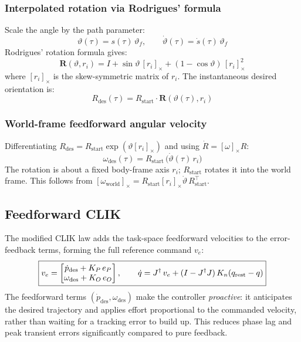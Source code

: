 \documentclass[11pt,a4paper]{article}
\begin{document}
\subsubsection*{Interpolated rotation via Rodrigues' formula}
Scale the angle by the path parameter:
\begin{equation}
  \vartheta(\tau)=s(\tau)\,\vartheta_f, \qquad \dot{\vartheta}(\tau)=\dot{s}(\tau)\,\vartheta_f
\end{equation}
Rodrigues' rotation formula gives:
\begin{equation}
  \mathbf{R}(\vartheta,r_i)=I+\sin\vartheta\,[r_i]_\times+(1-\cos\vartheta)\,[r_i]_\times^2
\end{equation}
where $[r_i]_\times$ is the skew-symmetric matrix of $r_i$. The instantaneous desired orientation is:
\begin{equation}
  R_{\mathrm{des}}(\tau)=R_{\mathrm{start}}\cdot\mathbf{R}(\vartheta(\tau),r_i)
\end{equation}

\subsubsection*{World-frame feedforward angular velocity}
Differentiating $R_{\mathrm{des}}=R_{\mathrm{start}}\exp(\vartheta[r_i]_\times)$
and using $\dot{R}=[{\omega}]_\times R$:
\begin{equation}
  \omega_{\mathrm{des}}(\tau) = R_{\mathrm{start}}\,\bigl(\dot{\vartheta}(\tau)\,r_i\bigr)
\end{equation}
The rotation is about a fixed body-frame axis $r_i$; $R_{\mathrm{start}}$
rotates it into the world frame. This follows from
$[{\omega}_{\mathrm{world}}]_\times = R_{\mathrm{start}}[r_i]_\times\dot{\vartheta}\,R_{\mathrm{start}}^\top$.

\subsection{Feedforward CLIK}

The modified CLIK law adds the task-space feedforward velocities to the
error-feedback terms, forming the full reference command $v_e$:
\begin{equation}
  \boxed{%
  v_e = \begin{bmatrix}\dot{p}_{\mathrm{des}}+K_P\,e_P\\\omega_{\mathrm{des}}+K_O\,e_O\end{bmatrix},
  \qquad
  \dot{q} = J^{\dagger}\,v_e + (I-J^{\dagger}J)\,K_n(q_{\mathrm{rest}}-q)
  }
\end{equation}
The feedforward terms $(\dot{p}_{\mathrm{des}},\omega_{\mathrm{des}})$ make the
controller \emph{proactive}: it anticipates the desired trajectory and applies
effort proportional to the commanded velocity, rather than waiting for a tracking
error to build up. This reduces phase lag and peak transient errors significantly
compared to pure feedback.
\end{document}
